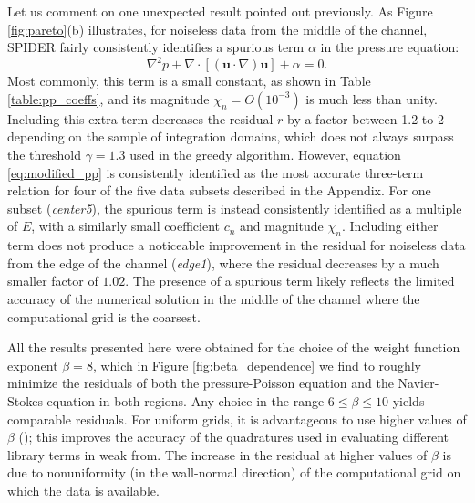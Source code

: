 \documentclass[preprint]{article}
\def\bi#1{\textbf{#1}}
\begin{document}
Let us comment on one unexpected result pointed out previously. As Figure \ref{fig:pareto}(b) illustrates, for noiseless data from the middle of the channel, {SPIDER fairly consistently identifies a spurious term $\alpha$ in the pressure equation:
\begin{equation}
\nabla^2 p + \nabla \cdot[({\bi u} \cdot \nabla) {\bi u}] + \alpha = 0.
\label{eq:modified_pp}
\end{equation}
Most commonly, this term is a small constant, as shown in Table \ref{table:pp_coeffs}, and its magnitude $\chi_n=O(10^{-3})$ is much less than unity. Including this extra term decreases the residual $r$ by a factor between 1.2 to 2 depending on the sample of integration domains, which does not always surpass the threshold $\gamma=1.3$ used in the greedy algorithm. However, equation \eqref{eq:modified_pp} is consistently identified as the most accurate three-term relation for four of the five data subsets described in the Appendix. For one subset ({\it center5}), the spurious term is instead consistently identified as a multiple of $E$, with a similarly small coefficient $c_n$ and magnitude $\chi_n$. Including either term does not produce a noticeable improvement in the residual for noiseless data from the edge of the channel ({\it edge1}), where the residual decreases by a much smaller factor of $1.02$. The presence of a spurious term likely reflects the limited accuracy of the numerical solution in the middle of the channel where the computational grid is the coarsest.}

All the results presented here were obtained for the choice of the weight function exponent $\beta = 8$, which in Figure \ref{fig:beta_dependence} we find to roughly minimize the residuals of both the pressure-Poisson equation and the Navier-Stokes equation in both regions. Any choice in the range $6\leq \beta\leq 10$ yields comparable residuals. For uniform grids, it is advantageous to use higher values of $\beta$ (\citet{gurevich2019}); this improves the accuracy of the quadratures used in evaluating different library terms in weak from. The increase in the residual at higher values of $\beta$ is due to nonuniformity (in the wall-normal direction) of the computational grid on which the data is available.

\begin{figure*}
\centering
{} \hfill
{}
\caption{Dependence of residuals in (a) the pressure equation and (b) the momentum equation on the $\beta$ hyperparameter. The solid (dashed) curves correspond to data near the middle (edge) of the channel.
}
\label{fig:beta_dependence}
\end{figure*}
\end{document}
